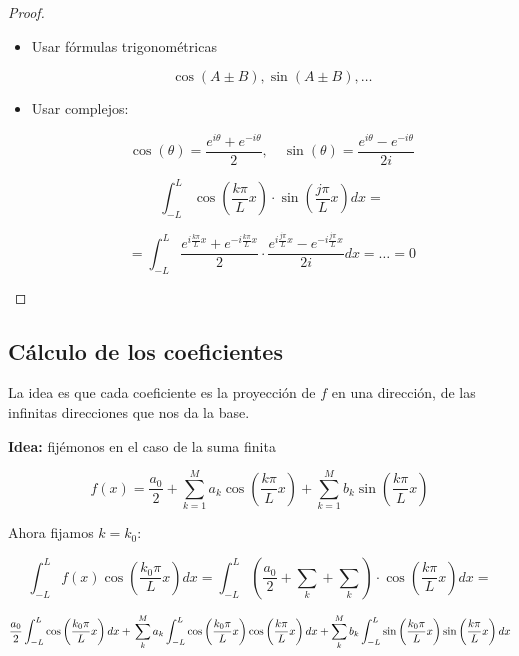 			\begin{proof}

				\begin{itemize}
					\item Usar fórmulas trigonométricas

						\[\cos(A ± B), \sin(A ± B), …\]

					\item Usar complejos:

						\[ \cos(\theta) = \frac{e^{i\theta} + e^{-i\theta} }{2}, \quad \sin(\theta) = \frac{e^{i\theta} - e^{-i\theta} }{2i}\]

						\[  \int^{L}_{-L} \cos \left( \frac{k \pi}{L} x \right) \cdot \sin \left( \frac{j \pi}{L} x \right) dx = \]

						\[ = \int^L_{-L} \frac{e^{i\frac{k\pi}{L}x} + e^{-i\frac{k\pi}{L}x} }{2} \cdot \frac{e^{i\frac{j\pi}{L}x} - e^{-i\frac{j\pi}{L}x} }{2i} dx = … = 0 \]

				\end{itemize}

			\end{proof}




	\subsection{Cálculo de los coeficientes}

		La idea es que cada coeficiente es la proyección de $f$ en una dirección, de las infinitas direcciones que nos da la base.

		\textbf{Idea:} fijémonos en el caso de la suma finita

		\[ f(x) = \frac{a_0}{2}+ \sum_{k=1}^M a_k \cos \left( \frac{k \pi}{L} x \right) + \sum_{k=1}^M b_k \sin \left( \frac{k \pi}{L} x \right)\]

		Ahora fijamos $k=k_0$:

		\[ \int^L_{-L} f(x) \cos \left( \frac{k_0 \pi}{L} x \right) dx = \int^L_{-L} (\frac{a_0}{2} + \sum_k + \sum_k ) \cdot  \cos \left( \frac{k \pi}{L} x \right) dx  = \]

		\[ \frac{a_0}{2}  \int^L_{-L} \cos \left( \frac{k_0 \pi}{L} x \right) dx +\\
		\sum_k^M a_k \int^L_{-L} \cos \left( \frac{k_0 \pi}{L} x \right) \cos \left( \frac{k \pi}{L} x \right) dx +
		\sum_k^M b_k \int^L_{-L} \sin \left( \frac{k_0 \pi}{L} x \right) \sin \left( \frac{k \pi}{L} x \right) dx \]

